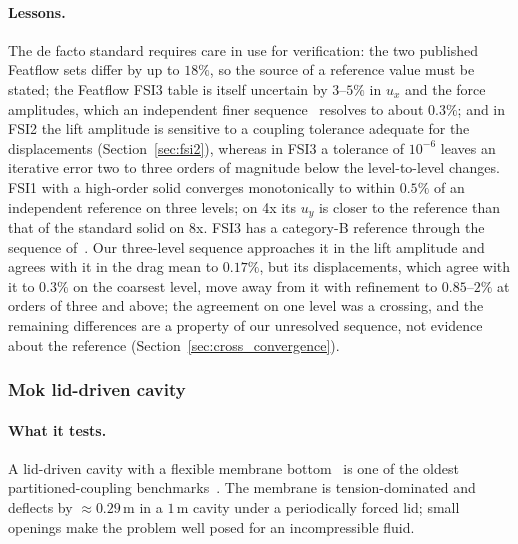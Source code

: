 \paragraph{Lessons.}
The de facto standard requires care in use for verification: the two published Featflow sets differ by up to $18\%$, so the source of a reference value must be stated; the Featflow FSI3 table is itself uncertain by $3$--$5\%$ in $u_x$ and the force amplitudes, which an independent finer sequence~\citep{Failer2020} resolves to about $0.3\%$; and in FSI2 the lift amplitude is sensitive to a coupling tolerance adequate for the displacements (Section~\ref{sec:fsi2}), whereas in FSI3 a tolerance of $10^{-6}$ leaves an iterative error two to three orders of magnitude below the level-to-level changes.
FSI1 with a high-order solid converges monotonically to within $0.5\%$ of an independent reference on three levels; on 4x its $u_y$ is closer to the reference than that of the standard solid on 8x.
FSI3 has a category-B reference through the sequence of~\citet{Failer2020}. Our three-level sequence approaches it in the lift amplitude and agrees with it in the drag mean to $0.17\%$, but its displacements, which agree with it to $0.3\%$ on the coarsest level, move away from it with refinement to $0.85$--$2\%$ at orders of three and above; the agreement on one level was a crossing, and the remaining differences are a property of our unresolved sequence, not evidence about the reference (Section~\ref{sec:cross_convergence}).

\subsubsection{Mok lid-driven cavity}\label{sec:mok}

\paragraph{What it tests.}
A lid-driven cavity with a flexible membrane bottom~\citep{Wall1999, Mok2001, MokWallRamm2001} is one of the oldest partitioned-coupling benchmarks~\citep{Gerbeau2003, kuttler2008fixed, Kassiotis2011}.
The membrane is tension-dominated and deflects by $\approx0.29\,\mathrm{m}$ in a $1\,\mathrm{m}$ cavity under a periodically forced lid; small openings make the problem well posed for an incompressible fluid.

